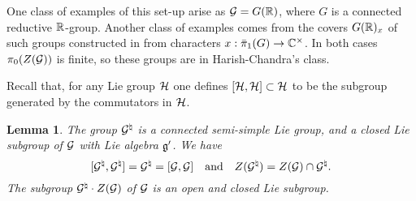 \documentclass{article}
\newtheorem{lem}[thm]{Lemma}
\theoremstyle{definition}
\numberwithin{equation}{section}
\renewcommand{\-}{\hyp{}}
\begin{document}
One class of examples of this set-up arise as $\mathcal{G}=G(\mathbb{R})$, where $G$ is a connected reductive $\mathbb{R}$-group. Another class of examples comes from the covers $G(\mathbb{R})_x$ of such groups constructed in \cite{KalHDC} from characters $x : \bar\pi_1(G) \to \mathbb{C}^\times$. In both cases $\pi_0(Z(\mathcal{G}))$ is finite, so these groups are in  Harish-Chandra's class.

Recall that, for any Lie group $\mathcal{H}$ one defines $[\mathcal{H},\mathcal{H}] \subset \mathcal{H}$ to be the subgroup generated by the commutators in $\mathcal{H}$.

\begin{lem} \label{lem:comm}
	The group $\mathcal{G}^\natural$ is a connected semi-simple Lie group, and a closed Lie subgroup of $\mathcal{G}$ with Lie algebra $\mathfrak{g}'$. We have
	\[ [\mathcal{G}^\natural,\mathcal{G}^\natural] = \mathcal{G}^\natural = [\mathcal{G},\mathcal{G}]\quad\textrm{and}\quad Z(\mathcal{G}^\natural) = Z(\mathcal{G}) \cap \mathcal{G}^\natural. \]
	The subgroup $\mathcal{G}^\natural \cdot Z(\mathcal{G})$ of $\mathcal{G}$ is an open and closed Lie subgroup.
\end{lem}
\end{document}
